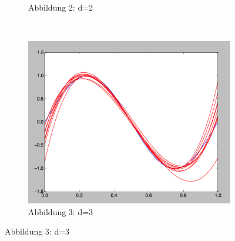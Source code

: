 \documentclass[a4paper,11pt,twoside]{article}
\begin{document}
\begin{figure}[h]
\begin{subfigure}[t]{0.33\textwidth}
		\caption{Abbildung 2: d=2}
	\end{subfigure}%
	~
	\begin{subfigure}[t]{0.33\textwidth}
		\includegraphics[width=\textwidth]{images/Nr_1/d_3.png}
		\caption{Abbildung 3: d=3}
	\end{subfigure}
\end{figure}
\end{document}
